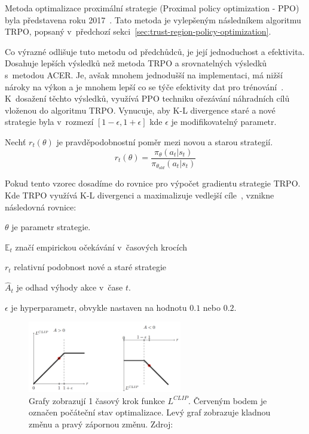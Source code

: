 Metoda optimalizace proximální strategie (Proximal policy optimization - PPO) byla představena roku 2017~\cite{PPO_paper}.
Tato metoda je vylepšeným následníkem algoritmu TRPO, popsaný v~předchozí sekci~\ref{sec:trust-region-policy-optimization}.

Co výrazné odlišuje tuto metodu od předchůdců, je její jednoduchost a efektivita.
Dosahuje lepších výsledků než metoda TRPO a srovnatelných výsledků s~metodou ACER\@.
Je, avšak mnohem jednodušší na implementaci, má nižší nároky na výkon a je mnohem lepší co se týče efektivity dat pro trénování~\cite{PPO_paper}.
K~dosažení těchto výsledků, využívá PPO techniku ořezávání náhradních cílů vloženou do algoritmu TRPO\@.
Vynucuje, aby K-L divergence staré a nové strategie byla v~rozmezí $[1-\epsilon, 1+\epsilon]$ kde $\epsilon$ je modifikovatelný parametr.

Nechť $r_t(\theta)$ je pravděpodobnostní poměr mezi novou a starou strategií.
\begin{equation}
  r_t(\theta) = \frac{\pi_\theta(a_t \vert s_t)}{\pi_{\theta_{old}}(a_t \vert s_t)}
\end{equation}

Pokud tento vzorec dosadíme do rovnice pro výpočet gradientu strategie TRPO.
Kde TRPO využívá K-L divergenci a maximalizuje vedlejší cíle~\cite{policy_gradients}, vznikne následovná rovnice:



\begin{myitemize}
  \item $\theta$ je parametr strategie.
  \item $\mathbb{E}_t$ značí empirickou očekávání v~časových krocích
  \item $r_t$ relativní podobnost nové a staré strategie~\cite{PPO_paper}
  \item $\hat{A}_t$ je odhad výhody akce v~čase $t$.
  \item $\epsilon$ je hyperparametr, obvykle nastaven na hodnotu $0.1$ nebo $0.2$.
\end{myitemize}

\begin{figure}[H]
	\centering
	\includegraphics[width=0.6\textwidth]{obrazky-figures/clip}
	\caption{Grafy zobrazují 1 časový krok funkce $L^{CLIP}$.
  Červeným bodem je označen počáteční stav optimalizace.
  Levý graf zobrazuje kladnou změnu a pravý zápornou změnu.
  Zdroj:~\cite{RL_basics}}\label{fig:clip}
\end{figure}

